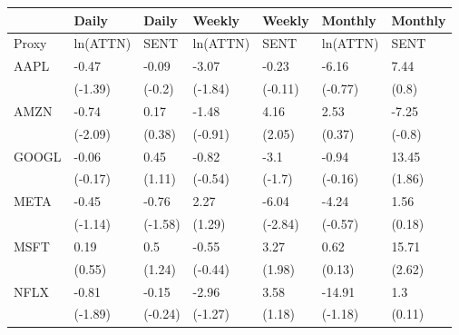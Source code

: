 \begin{tabular}{lllllll}
\toprule
{} &     Daily &    Daily &    Weekly &   Weekly &   Monthly & Monthly \\
\midrule
Proxy &  ln(ATTN) &     SENT &  ln(ATTN) &     SENT &  ln(ATTN) &    SENT \\
AAPL  &     -0.47 &    -0.09 &     -3.07 &    -0.23 &     -6.16 &    7.44 \\
      &   (-1.39) &   (-0.2) &   (-1.84) &  (-0.11) &   (-0.77) &   (0.8) \\
AMZN  &     -0.74 &     0.17 &     -1.48 &     4.16 &      2.53 &   -7.25 \\
      &   (-2.09) &   (0.38) &   (-0.91) &   (2.05) &    (0.37) &  (-0.8) \\
GOOGL &     -0.06 &     0.45 &     -0.82 &     -3.1 &     -0.94 &   13.45 \\
      &   (-0.17) &   (1.11) &   (-0.54) &   (-1.7) &   (-0.16) &  (1.86) \\
META  &     -0.45 &    -0.76 &      2.27 &    -6.04 &     -4.24 &    1.56 \\
      &   (-1.14) &  (-1.58) &    (1.29) &  (-2.84) &   (-0.57) &  (0.18) \\
MSFT  &      0.19 &      0.5 &     -0.55 &     3.27 &      0.62 &   15.71 \\
      &    (0.55) &   (1.24) &   (-0.44) &   (1.98) &    (0.13) &  (2.62) \\
NFLX  &     -0.81 &    -0.15 &     -2.96 &     3.58 &    -14.91 &     1.3 \\
      &   (-1.89) &  (-0.24) &   (-1.27) &   (1.18) &   (-1.18) &  (0.11) \\
\bottomrule
\end{tabular}
